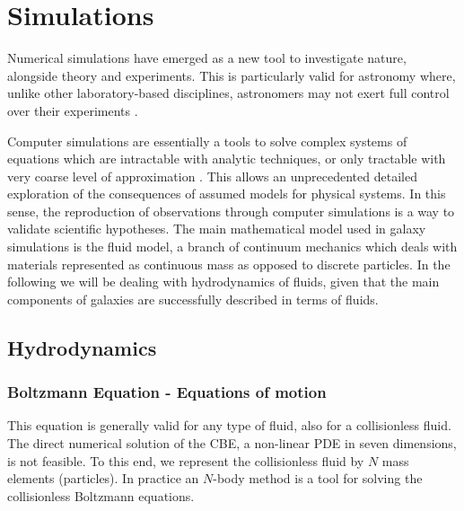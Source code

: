 
\chapter{Simulations}
\label{ch:simulations}

Numerical simulations have emerged as a new tool to investigate nature, alongside theory and experiments.
This is particularly valid for astronomy where, unlike other laboratory-based disciplines, astronomers may not exert full control over their experiments \citep{Heng2014}.

Computer simulations are essentially a tools to solve complex systems of equations which are intractable with analytic techniques, or only tractable with very coarse level of approximation \citep{Springel2015}.
This allows an unprecedented detailed exploration of the consequences of assumed models for physical systems. In this sense, the reproduction of observations through computer simulations is a way to validate scientific hypotheses.
The main mathematical model used in galaxy simulations is the fluid model, a branch of continuum mechanics which deals with materials represented as continuous mass as opposed to discrete particles.
In the following we will be dealing with hydrodynamics of fluids, given that the main components of galaxies are successfully described in terms of fluids.

\section{Hydrodynamics}

\subsection{Boltzmann Equation - Equations of motion}
This equation is generally valid for any type of fluid, also for a collisionless fluid.
The direct numerical solution of the CBE, a non-linear PDE in seven dimensions, is not feasible.
To this end, we represent the collisionless fluid by $N$ mass elements (particles).
In practice an $N$-body method is a tool for solving the collisionless Boltzmann equations.

